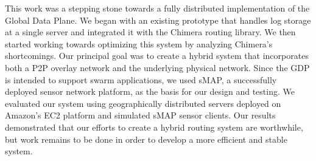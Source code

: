 This work was a stepping stone towards a fully distributed implementation of the Global Data Plane. We began with an existing prototype that handles log storage at a single server and integrated it with the Chimera routing library. We then started working towards optimizing this system by analyzing Chimera's shortcomings. Our principal goal was to create a hybrid system that incorporates both a P2P overlay network and the underlying physical network. Since the GDP is intended to support swarm applications, we used sMAP, a successfully deployed sensor network platform, as the basis for our design and testing. We evaluated our system using geographically distributed servers deployed on Amazon's EC2 platform and simulated sMAP sensor clients. Our results demonstrated that our efforts to create a hybrid routing system are worthwhile, but work remains to be done in order to develop a more efficient and stable system.